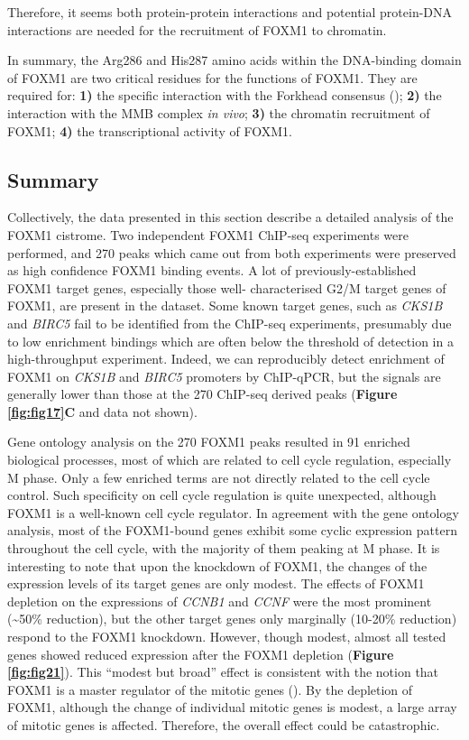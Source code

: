 Therefore, it seems both protein-protein interactions and potential protein-DNA interactions are needed for the recruitment of FOXM1 to chromatin.

In summary, the Arg286 and His287 amino acids within the DNA-binding domain of FOXM1 are two critical residues for the functions of FOXM1. They are required for: \textbf{1)} the specific interaction with the Forkhead consensus (\cite{littler2010structure}); \textbf{2)} the interaction with the MMB complex \textit{in vivo}; \textbf{3)} the chromatin recruitment of FOXM1; \textbf{4)} the transcriptional activity of FOXM1.

\subsection{Summary}

Collectively, the data presented in this section describe a detailed analysis of the FOXM1 cistrome. Two independent FOXM1 ChIP-seq experiments were performed, and 270 peaks which came out from both experiments were preserved as high confidence FOXM1 binding events. A lot of previously-established FOXM1 target genes, especially those well- characterised G2/M target genes of FOXM1, are present in the dataset. Some known target genes, such as \textit{CKS1B} and \textit{BIRC5}  fail to be identified from the ChIP-seq experiments, presumably due to low enrichment bindings which are often below the threshold of detection in a high-throughput experiment. Indeed, we can reproducibly detect enrichment of FOXM1 on \textit{CKS1B} and \textit{BIRC5} promoters by ChIP-qPCR, but the signals are generally lower than those at the 270 ChIP-seq derived peaks (\textbf{Figure \ref{fig:fig17}C} and data not shown).

Gene ontology analysis on the 270 FOXM1 peaks resulted in 91 enriched biological processes, most of which are related to cell cycle regulation, especially M phase. Only a few enriched terms are not directly related to the cell cycle control. Such specificity on cell cycle regulation is quite unexpected, although FOXM1 is a well-known cell cycle regulator. In agreement with the gene ontology analysis, most of the FOXM1-bound genes exhibit some cyclic expression pattern throughout the cell cycle, with the majority of them peaking at M phase. It is interesting to note that upon the knockdown of FOXM1, the changes of the expression levels of its target genes are only modest. The effects of FOXM1 depletion on the expressions of \textit{CCNB1} and \textit{CCNF} were the most prominent (\textasciitilde 50\% reduction), but the other target genes only marginally (10-20\% reduction) respond to the FOXM1 knockdown. However, though modest, almost all tested genes showed reduced expression after the FOXM1 depletion (\textbf{Figure \ref{fig:fig21}}). This \enquote{modest but broad} effect is consistent with the notion that FOXM1 is a master regulator of the mitotic genes (\cite{laoukili2005foxm1,lefebvre2010a}). By the depletion of FOXM1, although the change of individual mitotic genes is modest, a large array of mitotic genes is affected. Therefore, the overall effect could be catastrophic.

